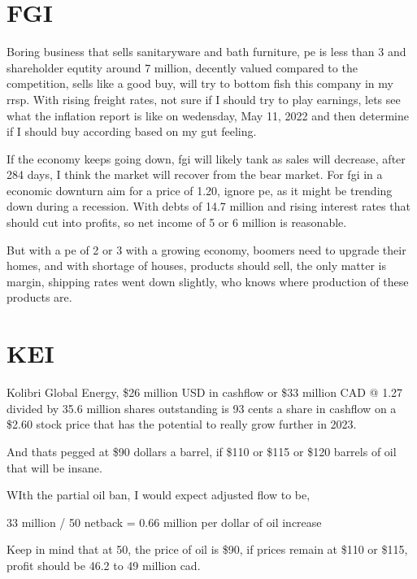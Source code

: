\section{FGI}

Boring business that sells sanitaryware and bath furniture, pe is less than 3 and shareholder equtity around 7 million, decently valued compared to the competition, sells like a good buy, will try to bottom fish this company in my rrsp. With rising freight rates, not sure if I should try to play earnings, lets see what the inflation report is like on wedensday, May 11, 2022 and then determine if I should buy according based on my gut feeling.

If the economy keeps going down, fgi will likely tank as sales will decrease, after 284 days, I think the market will recover from the bear market. For fgi in a economic downturn aim for a price of 1.20, ignore pe, as it might be trending down during a recession. With debts of 14.7 million and rising interest rates that should cut into profits, so net income of 5 or 6 million is reasonable.

But with a pe of 2 or 3 with a growing economy, boomers need to upgrade their homes, and with shortage of houses, products should sell, the only matter is margin, shipping rates went down slightly, who knows where production of these products are.

\section{KEI}

Kolibri Global Energy, \$26 million USD in cashflow or \$33 million CAD @ 1.27 divided by 35.6 million shares outstanding is 93 cents a share in cashflow on a \$2.60 stock price that has the potential to really grow further in 2023. 

And thats pegged at \$90 dollars a barrel, if \$110 or \$115 or \$120 barrels of oil that will be insane.


WIth the partial oil ban, I would expect adjusted flow to be, 


33 million / 50 netback = 0.66 million per dollar of oil increase

Keep in mind that at 50, the price of oil is \$90, if prices remain at \$110 or \$115, profit should be 46.2 to 49 million cad.

